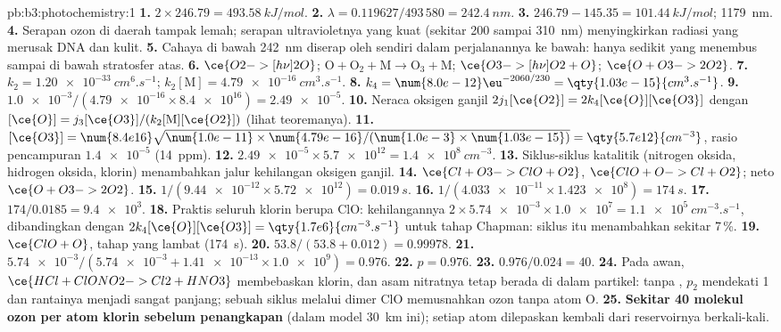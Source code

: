 \begin{solution}{pb:b3:photochemistry:1}
\textbf{1.} $2 \times 246.79 = \qty{493.58}{kJ/mol}$.
\textbf{2.} $\lambda = 0.119627/493\,580 = \qty{242.4}{nm}$.
\textbf{3.} $246.79 - 145.35 = \qty{101.44}{kJ/mol}$; \qty{1179}{nm}.
\textbf{4.} Serapan ozon di daerah tampak lemah; serapan ultravioletnya yang kuat
(sekitar 200 sampai \qty{310}{nm}) menyingkirkan radiasi yang merusak DNA dan
kulit.
\textbf{5.} Cahaya di bawah \qty{242}{nm} diserap oleh  sendiri dalam
perjalanannya ke bawah: hanya sedikit yang menembus sampai di bawah stratosfer
atas.
\textbf{6.} $\ce{O2 ->[h\nu] 2 O}$; $\mathrm{O + O_2 + M \to O_3 + M}$; $\ce{O3 ->[h\nu] O2 + O}$; $\ce{O + O3 -> 2 O2}$.
\textbf{7.} $k_2 = \qty{1.20e-33}{cm^6.s^{-1}}$; $k_2[\mathrm M] = \qty{4.79e-16}{cm^3.s^{-1}}$.
\textbf{8.} $k_4 = \num{8.0e-12}\eu^{-2060/230} = \qty{1.03e-15}{cm^3.s^{-1}}$.
\textbf{9.} $\num{1.0e-3}/(\num{4.79e-16} \times \num{8.4e16}) = \num{2.49e-5}$.
\textbf{10.} Neraca oksigen ganjil $2j_1[\ce{O2}] = 2k_4[\ce{O}][\ce{O3}]$ dengan $[\ce{O}] = j_3[\ce{O3}]/(k_2[\mathrm M][\ce{O2}])$
(lihat teoremanya).
\textbf{11.} $[\ce{O3}] = \num{8.4e16}\sqrt{\num{1.0e-11} \times \num{4.79e-16}/(\num{1.0e-3} \times \num{1.03e-15})} =
\qty{5.7e12}{cm^{-3}}$, rasio pencampuran $\num{1.4e-5}$ (\qty{14}{ppm}).
\textbf{12.} $\num{2.49e-5} \times \num{5.7e12} = \qty{1.4e8}{cm^{-3}}$.
\textbf{13.} Siklus-siklus katalitik (nitrogen oksida, hidrogen oksida, klorin)
menambahkan jalur kehilangan oksigen ganjil.
\textbf{14.} $\ce{Cl + O3 -> ClO + O2}$, $\ce{ClO + O -> Cl + O2}$; neto $\ce{O + O3 -> 2 O2}$.
\textbf{15.} $1/(\num{9.44e-12} \times \num{5.72e12}) = \qty{0.019}{s}$.
\textbf{16.} $1/(\num{4.033e-11} \times \num{1.423e8}) = \qty{174}{s}$.
\textbf{17.} $174/0.0185 = \num{9.4e3}$.
\textbf{18.} Praktis seluruh klorin berupa ClO: kehilangannya
$2 \times \num{5.74e-3} \times \num{1.0e7} = \qty{1.1e5}{cm^{-3}.s^{-1}}$, dibandingkan dengan
$2k_4[\ce{O}][\ce{O3}] = \qty{1.7e6}{cm^{-3}.s^{-1}}$ untuk tahap Chapman: siklus itu
menambahkan sekitar 7\,\%.
\textbf{19.} $\ce{ClO + O}$, tahap yang lambat (\qty{174}{s}).
\textbf{20.} $53.8/(53.8 + 0.012) = 0.99978$.
\textbf{21.} $\num{5.74e-3}/(\num{5.74e-3} + \num{1.41e-13} \times \num{1.0e9}) = 0.976$.
\textbf{22.} $p = 0.976$.
\textbf{23.} $0.976/0.024 = 40$.
\textbf{24.} Pada awan, $\ce{HCl + ClONO2 -> Cl2 + HNO3}$ membebaskan klorin, dan asam
nitratnya tetap berada di dalam partikel: tanpa , $p_2$ mendekati 1 dan
rantainya menjadi sangat panjang; sebuah siklus melalui dimer ClO memusnahkan
ozon tanpa atom O.
\textbf{25.} \textbf{Sekitar 40 molekul ozon per atom klorin sebelum
penangkapan} (dalam model \qty{30}{km} ini); setiap atom dilepaskan kembali dari
reservoirnya berkali-kali.
\end{solution}
